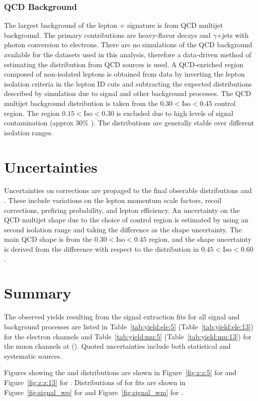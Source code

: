  
\subsubsection{QCD Background}\label{ch:w:qcd}
The largest background of the \wlnu lepton + \met signature is from QCD multijet background. The primary contributions are heavy-flavor decays and $\gamma$+jets with photon conversion to electrons. 
There are no simulations of the QCD background available for the datasets used in this analysis, therefore a data-driven method of estimating the \mt distribution from QCD sources is used. A QCD-enriched region composed of non-isolated leptons is obtained from data by inverting the lepton isolation criteria in the lepton ID cuts and subtracting the expected \mt distributions described by simulation due to \W signal and other background processes. The QCD multijet background \mt distribution is taken from the $0.30 < \mathrm{Iso} < 0.45$ control region. The region $0.15 < \mathrm{Iso} < 0.30$ is excluded due to high levels of \W signal contamination (approx 30\% \W). The \mt distributions are generally stable over different isolation ranges.


\section{Uncertainties}\label{ch:unc}
Uncertainties on corrections are propaged to the final obserable distributions \mt and \mll. These include variations on the lepton momentum scale factors, recoil corrections, prefiring probability, and lepton efficiency.
An uncertainty on the QCD multijet shape due to the choice of control region is estimated by using an second isolation range and taking the difference as the shape uncertainty. The main QCD \mt shape is from the $0.30 < \mathrm{Iso} < 0.45$ region, and the shape uncertainty is derived from the difference with respect to the \mt distribution in $0.45 < \mathrm{Iso} < 0.60$. 

\section{Summary}

The observed yields resulting from the signal extraction fits for all signal and background processes are listed in Table~\ref{tab:yield:ele:5} (Table~\ref{tab:yield:ele:13}) for the electron channels and Table~\ref{tab:yield:mu:5} (Table~\ref{tab:yield:mu:13}) for the muon channels at \serag (\serah). Quoted uncertainties include both statistical and systematic sources.

Figures showing the \Zmm and \Zee \mll distributions are shown in Figure~\ref{fig:z:z:5} for \serag and Figure~\ref{fig:z:z:13} for \serah. Distributions of \mt for \W fits are shown in Figure~\ref{fig:signal_wp} for \Wp and Figure~\ref{fig:signal_wm} for \Wm.

 







